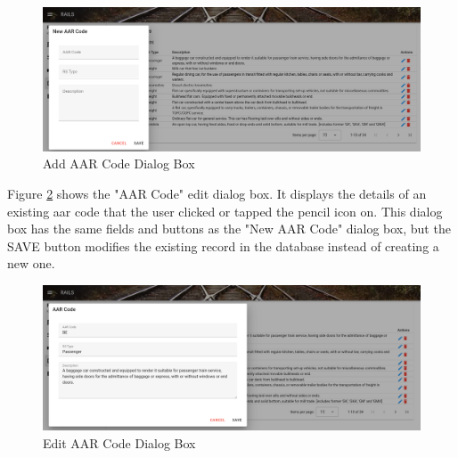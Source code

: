 \begin{figure}[H]
    \centering
    \includegraphics[scale=0.33]{./images/aar-add.png}
    \caption{Add AAR Code Dialog Box}
    \label{fig:aar2}
\end{figure}

Figure \ref{fig:aar3} shows the "AAR Code" edit dialog box. It displays the details of an existing \gls{aar} code that 
the user clicked or tapped the pencil icon on. This dialog box has the same fields and buttons as the "New AAR Code" dialog box, 
but the SAVE button modifies the existing record in the database instead of creating a new one.

\begin{figure}[H]
    \centering
    \includegraphics[scale=0.33]{./images/aar-edit.png}
    \caption{Edit AAR Code Dialog Box}
    \label{fig:aar3}
\end{figure}
